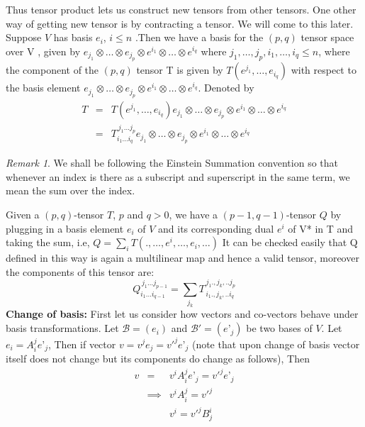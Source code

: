\documentclass[a4paper]{report}
\theoremstyle{definition}
\theoremstyle{remark}
\newtheorem*{remark}{Remark}
\begin{document}
		Thus tensor product lets us construct new tensors from other tensors. One other way of getting new tensor is by contracting a tensor. We will come to this later.
		Suppose $V$ has basis ${e_i}$, $i\leq n$ .Then we have a basis for the $(p,q)$ tensor space over V , given by $e_{j_1}\otimes \dots \otimes e_{j_p}\otimes e^{i_1}\otimes \dots\otimes e^{i_q}$ where $j_1,\dots,j_p,i_1,\dots,i_q\leq n$, where the component of the $(p,q)$ tensor T is given by $T(e^{j_1},\dots,e_{i_q})$ with respect to the basis element $e_{j_1}\otimes\dots\otimes e_{j_p}\otimes e^{i_1}\otimes \dots\otimes e^{i_q}$.
		Denoted by 
		\begin{eqnarray*}
			T&=& T(e^{j_1},\dots,e_{i_q})e_{j_1}\otimes\dots\otimes e_{j_p}\otimes e^{i_1}\otimes \dots\otimes e^{i_q} \\
			&=& T^{\hspace{2pt}j_1...j_p}_{i_1...i_q}e_{j_1}\otimes\dots\otimes e_{j_p}\otimes e^{i_1}\otimes \dots\otimes e^{i_q}
		\end{eqnarray*}
		\begin{remark}
			We shall be following the Einstein Summation convention so that whenever an index is there as a subscript and superscript in the same term, we mean the sum over the index.
		\end{remark}
		Given a $(p,q)$-tensor $T$, $p$ and $q > 0$, we have a $(p-1,q-1)$-tensor $Q$  by plugging in a basis element $e_i$ of $V$ and its corresponding dual $e^i$ of V* in T and taking the sum, i.e,
		$Q=\sum_{i} T(.,\dots,e^i,\dots,e_i,\dots)$
		It can be checked easily that Q defined in this way is again a multilinear map and hence a valid tensor, moreover the components of this tensor are:
		\begin{equation*}
			Q^{\hspace{2pt}j_1...j_{p-1}}_{\hspace{0pt}i_1...i_{q-1}} = \sum_{j_k}T^{\hspace{2pt}j_1.,j_k,..j_p}_{\hspace{2pt}i_1.,j_k,..i_q}
		\end{equation*}
		\textbf{Change of basis:}
		First let us consider how vectors and co-vectors behave under basis transformations.
		Let $\mathcal{B} = (e_i)$ and $\mathcal{B'}= (e’_j)$ be two bases of $V$. Let $e_i = A_i^j e’_j$, Then if vector $v = v^j e_j = v'^j e’_j$ (note that upon change of basis vector itself does not change but its components do change as follows),
		Then 
		\begin{eqnarray*}
			v&=&v^i A_i^j e’_j = v'^j e’_j\\ &\implies & v^i A_i^j = v'^j  \\
			&& v^i = v'^j B_j^i 
		\end{eqnarray*}
\end{document}
